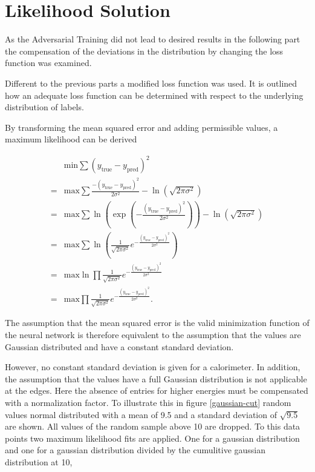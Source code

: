 \documentclass[12pt, a4paper]{thesis}
\begin{document}
\section{Likelihood Solution}
\label{sec:org05c2ceb}

As the Adversarial Training did not lead to desired results in the
following part the compensation of the deviations in the distribution
by changing the loss function was examined.

Different to the previous parts a modified loss function was used. It
is outlined how an adequate loss function can be determined with
respect to the underlying distribution of labels.

By transforming the mean squared error and adding permissible values,
a maximum likelihood can be derived

\begin{align}
    &\text{min} \sum (y_{\text{true}}-y_{\text{pred}})^2
  \\ =&\text{max} \sum\frac{-(y_{\text{true}}-y_{\text{pred}})^2}{2
    \sigma^2} - \ln(\sqrt{2\pi \sigma^2}) \\ = &\text{max} \sum
  \ln(\exp(-\frac{(y_{\text{true}}-y_{\text{pred}})^2}{2 \sigma^2})) -
  \ln(\sqrt{2\pi \sigma^2}) \\ = &\text{max} \sum \ln(
  \frac{1}{\sqrt{2\pi \sigma^2}}
  e^{-\frac{(y_{\text{true}}-y_{\text{pred}})^2}{2 \sigma^2}}) \\ =
  &\text{max} \ln \prod \frac{1}{\sqrt{2\pi \sigma^2}}
  e^{-\frac{(y_{\text{true}}-y_{\text{pred}})^2}{2 \sigma^2}}\\ =
  &\text{max} \prod \frac{1}{\sqrt{2\pi \sigma^2}}
  e^{-\frac{(y_{\text{true}}-y_{\text{pred}})^2}{2 \sigma^2}}.
\end{align}

The assumption that the mean squared error is the valid minimization
function of the neural network is therefore equivalent to the
assumption that the values are Gaussian distributed and have a
constant standard deviation.

However, no constant standard deviation is given for a calorimeter. In
addition, the assumption that the values have a full Gaussian
distribution is not applicable at the edges. Here the absence of
entries for higher energies must be compensated with a normalization
factor. To illustrate this in figure \ref{gaussian-cut} random values
normal distributed with a mean of 9.5 and a standard deviation of
$\sqrt{9.5}$ are shown. All values of the random sample above 10 are
dropped. To this data points two maximum likelihood fits are
applied. One for a gaussian distribution and one for a gaussian
distribution divided by the cumulitive gaussian distribution at 10,
\end{document}

